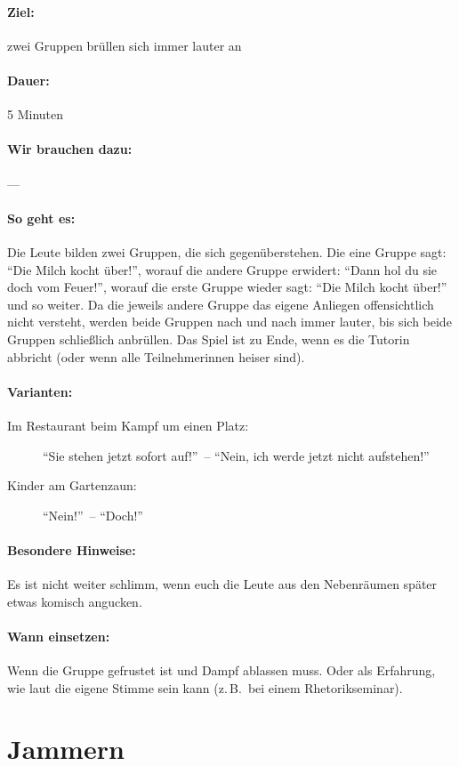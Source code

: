 \paragraph{Ziel:} zwei Gruppen brüllen sich immer lauter an
\paragraph{Dauer:} 5 Minuten
\paragraph{Wir brauchen dazu:} ---
\paragraph{So geht es:} Die Leute bilden zwei Gruppen, die sich gegenüberstehen. Die eine Gruppe sagt: "`Die Milch kocht über!"', worauf die andere Gruppe erwidert: "`Dann hol du sie doch vom Feuer!"', worauf die erste Gruppe wieder sagt: "`Die Milch kocht über!"' und so weiter. Da die jeweils andere Gruppe das eigene Anliegen offensichtlich nicht versteht, werden beide Gruppen nach und nach immer lauter, bis sich beide Gruppen schließlich anbrüllen. Das Spiel ist zu Ende, wenn es die Tutorin abbricht (oder wenn alle Teilnehmerinnen heiser sind).
\paragraph{Varianten:}
  \begin{description}
    \item[Im Restaurant beim Kampf um einen Platz:] "`Sie stehen jetzt sofort auf!"'~-- "`Nein, ich werde jetzt nicht aufstehen!"'
    \item[Kinder am Gartenzaun:] "`Nein!"'~-- "`Doch!"'
  \end{description}
\paragraph{Besondere Hinweise:} Es ist nicht weiter schlimm, wenn euch die Leute aus den Nebenräumen später etwas komisch angucken.
\paragraph{Wann einsetzen:} Wenn die Gruppe gefrustet ist und Dampf ablassen muss. Oder als Erfahrung, wie laut die eigene Stimme sein kann (z.\,B.~bei einem Rhetorikseminar).

\section{Jammern}
